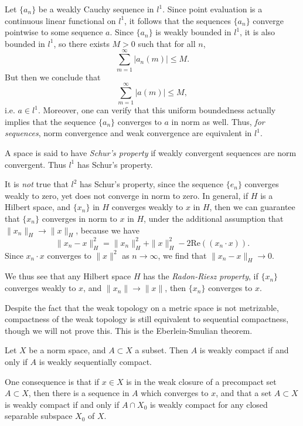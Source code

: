 \begin{example}
    Let $\{ a_n \}$ be a weakly Cauchy sequence in $l^1$. Since point evaluation is a continuous linear functional on $l^1$, it follows that the sequences $\{ a_n \}$ converge pointwise to some sequence $a$. Since $\{ a_n \}$ is weakly bounded in $l^1$, it is also bounded in $l^1$, so there exists $M > 0$ such that for all $n$,
    \[ \sum_{m = 1}^\infty |a_n(m)| \leq M. \]
    But then we conclude that
    \[ \sum_{m = 1}^\infty |a(m)| \leq M, \]
    i.e. $a \in l^1$. Moreover, one can verify that this uniform boundedness actually implies that the sequence $\{ a_n \}$ converges to $a$ in norm as well. Thus, \emph{for sequences}, norm convergence and weak convergence are equivalent in $l^1$.
\end{example}

A space is said to have \emph{Schur's property} if weakly convergent sequences are norm convergent. Thus $l^1$ has Schur's property.

\begin{example}
    It is \emph{not} true that $l^2$ has Schur's property, since the sequence $\{ e_n \}$ converges weakly to zero, yet does not converge in norm to zero. In general, if $H$ is a Hilbert space, and $\{ x_n \}$ in $H$ converges weakly to $x$ in $H$, then we can guarantee that $\{ x_n \}$ converges in norm to $x$ in $H$, under the additional assumption that $\| x_n \|_H \to \| x \|_H$, because we have
    \[ \| x_n - x \|_H^2 = \| x_n \|^2_H + \| x \|^2_H - 2 \text{Re}( (x_n \cdot x) ). \]
    Since $x_n \cdot x$ converges to $\| x \|^2$ as $n \to \infty$, we find that $\| x_n - x \|_H \to 0$.
\end{example}

We thus see that any Hilbert space $H$ has the \emph{Radon-Riesz property}, if $\{ x_n \}$ converges weakly to $x$, and $\| x_n \| \to \| x \|$, then $\{ x_n \}$ converges to $x$.

Despite the fact that the weak topology on a metric space is not metrizable, compactness of the weak topology is still equivalent to sequential compactness, though we will not prove this. This is the Eberlein-Smulian theorem.

\begin{theorem}
    Let $X$ be a norm space, and $A \subset X$ a subset. Then $A$ is weakly compact if and only if $A$ is weakly sequentially compact.
\end{theorem}

One consequence is that if $x \in X$ is in the weak closure of a precompact set $A \subset X$, then there is a sequence in $A$ which converges to $x$, and that a set $A \subset X$ is weakly compact if and only if $A \cap X_0$ is weakly compact for any closed separable subspace $X_0$ of $X$.

